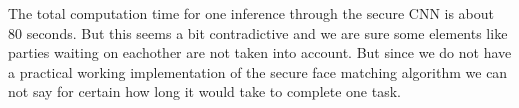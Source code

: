 The total computation time for one inference through the secure CNN is about 80 seconds. But this seems a bit contradictive and we are sure some elements like parties waiting on eachother are not taken into account. But since we do not have a practical working implementation of the secure face matching algorithm we can not say for certain how long it would take to complete one task.
